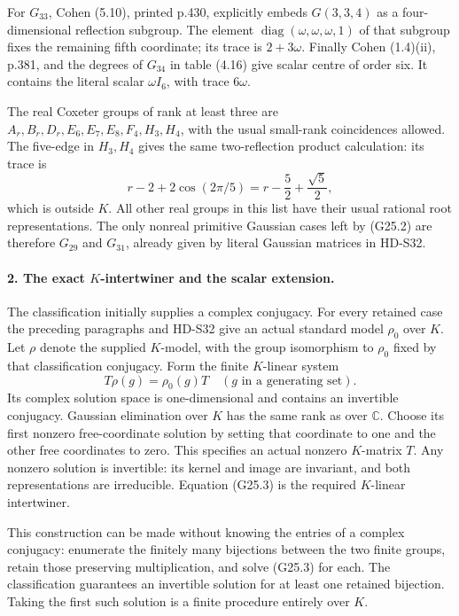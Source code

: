 For \(G_{33}\), Cohen (5.10), printed p.430, explicitly
embeds \(G(3,3,4)\) as a four-dimensional reflection subgroup.
The element
\(\operatorname{diag}(\omega,\omega,\omega,1)\) of that
subgroup fixes the remaining fifth coordinate; its trace is
\(2+3\omega\). Finally Cohen (1.4)(ii), p.381, and the
degrees of \(G_{34}\) in table (4.16) give scalar centre
of order six. It contains the literal scalar \(\omega I_6\),
with trace \(6\omega\).

The real Coxeter groups of rank at least three are
\(A_r,B_r,D_r,E_6,E_7,E_8,F_4,H_3,H_4\), with the
usual small-rank coincidences allowed. The five-edge in
\(H_3,H_4\) gives the same two-reflection product calculation:
its trace is
\[
                  r-2+2\cos(2\pi/5)
                    =r-\frac52+\frac{\sqrt5}{2},
\]
which is outside \(K\). All other real groups in this list
have their usual rational root representations. The only
nonreal primitive Gaussian cases left by (G25.2) are therefore
\(G_{29}\) and \(G_{31}\), already given by literal
Gaussian matrices in HD-S32.

\paragraph{2. The exact \(K\)-intertwiner and the scalar extension.}
The classification initially supplies a complex conjugacy.
For every retained case the preceding paragraphs and HD-S32
give an actual standard model \(\rho_0\) over \(K\).
Let \(\rho\) denote the supplied \(K\)-model, with the group
isomorphism to \(\rho_0\) fixed by that classification conjugacy.
Form the finite \(K\)-linear system
\[
                   T\rho(g)=\rho_0(g)T
                         \quad(g\text{ in a generating set}).
                                                            \tag{G25.3}
\]
Its complex solution space is one-dimensional and contains
an invertible conjugacy. Gaussian elimination over \(K\)
has the same rank as over \(\mathbb C\). Choose its first
nonzero free-coordinate solution by setting that coordinate
to one and the other free coordinates to zero. This specifies
an actual nonzero \(K\)-matrix \(T\). Any nonzero solution
is invertible: its kernel and image are invariant, and both
representations are irreducible. Equation (G25.3) is the
required \(K\)-linear intertwiner.

This construction can be made without knowing the entries
of a complex conjugacy: enumerate the finitely many bijections
between the two finite groups, retain those preserving
multiplication, and solve (G25.3) for each. The classification
guarantees an invertible solution for at least one retained
bijection. Taking the first such solution is a finite
procedure entirely over \(K\).

